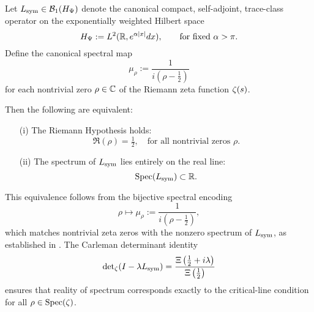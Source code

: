\begin{theorem}
\label{thm:rh_spectrum_equiv}

Let \( L_{\mathrm{sym}} \in \mathcal{B}_1(H_{\Psi}) \) denote the canonical compact, self-adjoint, trace-class operator on the exponentially weighted Hilbert space
\[
H_{\Psi} := L^2(\mathbb{R}, e^{\alpha |x|} dx),
\qquad \text{for fixed } \alpha > \pi.
\]
Define the canonical spectral map
\[
\mu_\rho := \frac{1}{i(\rho - \tfrac{1}{2})}
\]
for each nontrivial zero \( \rho \in \mathbb{C} \) of the Riemann zeta function \( \zeta(s) \).

Then the following are equivalent:
\begin{enumerate}
  \item[\textup{(i)}] The Riemann Hypothesis holds:
  \[
  \Re(\rho) = \tfrac{1}{2}, \quad \text{for all nontrivial zeros } \rho.
  \]

  \item[\textup{(ii)}] The spectrum of \( L_{\mathrm{sym}} \) lies entirely on the real line:
  \[
  \operatorname{Spec}(L_{\mathrm{sym}}) \subset \mathbb{R}.
  \]
\end{enumerate}

\medskip

\noindent
This equivalence follows from the bijective spectral encoding
\[
\rho \mapsto \mu_\rho := \frac{1}{i(\rho - \tfrac{1}{2})},
\]
which matches nontrivial zeta zeros with the nonzero spectrum of \( L_{\mathrm{sym}} \), as established in . The Carleman determinant identity
\[
\det\nolimits_\zeta(I - \lambda L_{\mathrm{sym}}) = \frac{\Xi\left( \tfrac{1}{2} + i\lambda \right)}{\Xi\left( \tfrac{1}{2} \right)}
\]
ensures that reality of spectrum corresponds exactly to the critical-line condition for all \( \rho \in \operatorname{Spec}(\zeta) \).
\end{theorem}
